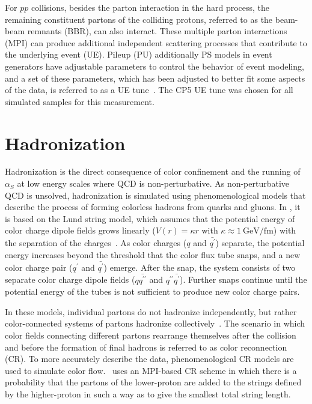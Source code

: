 For $pp$ collisions, besides the parton interaction in the hard process, the remaining constituent partons of the colliding protons, referred to as the beam-beam remnants (BBR), can also interact.
These multiple parton interactions (MPI) can produce additional independent scattering processes that contribute to the underlying event (UE).
Pileup (PU) additionally 
PS models in event generators have adjustable parameters to control the behavior of event modeling, and a set of these parameters, which has been adjusted to better fit some aspects of the data, is referred to as a UE tune~\cite{Sirunyan:2669320}.
The CP5 UE tune was chosen for all simulated samples for this measurement.

\section{Hadronization}
Hadronization is the direct consequence of color confinement and the running of $\alpha_S$ at low energy scales where QCD is non-perturbative.
As non-perturbative QCD is unsolved, hadronization is simulated using phenomenological models that describe the process of forming colorless hadrons from quarks and gluons.
In \Pythia, it is based on the Lund string model, which assumes that the potential energy of color charge dipole fields grows linearly ($V(r) = \kappa r$ with $\kappa \approx \SI{1}{\GeV \per \femto \m}$) with the separation of the charges~\cite{SJOSTRAND2015159}.
As color charges ($q$ and $\bar{q^\prime}$) separate, the potential energy increases beyond the threshold that the color flux tube snaps, and a new color charge pair ($q^\prime$ and $\bar{q^\prime}$) emerge.
After the snap, the system consists of two separate color charge dipole fields ($q\bar{q^{\prime\prime}}$ and $q^{\prime\prime}\bar{q^\prime}$).
Further snaps continue until the potential energy of the tubes is not sufficient to produce new color charge pairs.

In these models, individual partons do not hadronize independently, but rather color-connected systems of partons hadronize collectively~\cite{BUCKLEY2011145}.
The scenario in which color fields connecting different partons rearrange themselves after the collision and before the formation of final hadrons is referred to as color reconnection (CR).
To more accurately describe the data, phenomenological CR models are used to simulate color flow.
\Pythia\ uses an MPI-based CR scheme in which there is a probability that the partons of the lower-\pT proton are added to the strings defined by the higher-\pT proton in such a way as to give the smallest total string length.

